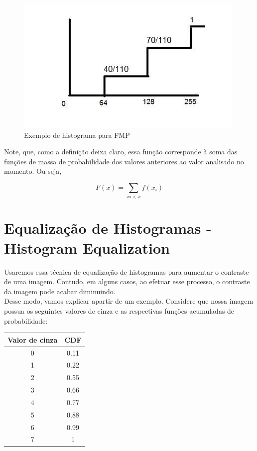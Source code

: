 \documentclass[a4paper, 12pt]{article}
\begin{document}
\begin{enumerate}
	\begin{figure}[!htbp]
		\centering
		\includegraphics[scale=0.5]{images/prob3.jpg}
		\caption{Exemplo de histograma para FMP}
	\end{figure}
	
	Note, que, como a definição deixa claro, essa função corresponde à soma das funções de massa de probabilidade dos valores anteriores ao valor analisado 
	no momento. Ou seja, 
	\begin{center}
		\[F(x) = \sum_{xi<x}{f(x_i)} \]
	\end{center}
\end{enumerate}

\section{Equalização de Histogramas - Histogram Equalization}
Usaremos essa técnica de equalização de histogramas para aumentar o contraste de uma imagem. Contudo, em alguns casos, ao efetuar esse processo, 
o contraste da imagem pode acabar diminuindo.
\\

Desse modo, vamos explicar apartir de um exemplo. Considere que nossa imagem possua os seguintes valores de cinza e as respectivas funções acumuladas 
de probabilidade:

\begin{table}[!htbp]
	\centering
	\begin{tabular}{|c|c|}
	\hline
	Valor de cinza & CDF  \\ \hline
	0              & 0.11 \\ \hline
	1              & 0.22 \\ \hline
	2              & 0.55 \\ \hline
	3              & 0.66 \\ \hline
	4              & 0.77 \\ \hline
	5              & 0.88 \\ \hline
	6              & 0.99 \\ \hline
	7              & 1    \\ \hline
	\end{tabular}
\end{table}
\end{document}
